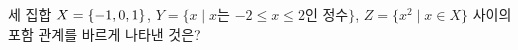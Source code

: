 세 집합 $X=\{-1{,}\mkern3mu\mathopen{}0{,}\mkern3mu\mathopen{}1\}$, $Y=\{x \mid x$는 $-2\le x\le 2$인 정수$\}$, $Z=\{x^2 \mid x\in X\}$ 사이의 포함 관계를 바르게 나타낸 것은?
